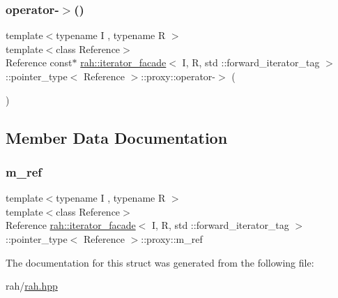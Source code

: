 \subsubsection{\texorpdfstring{operator-\/$>$()}{operator->()}}
{\footnotesize\ttfamily template$<$typename I , typename R $>$ \\
template$<$class Reference$>$ \\
Reference const$\ast$ \mbox{\hyperlink{structrah_1_1iterator__facade}{rah\+::iterator\+\_\+facade}}$<$ I, R, std \+::forward\+\_\+iterator\+\_\+tag $>$\+::pointer\+\_\+type$<$ Reference $>$\+::proxy\+::operator-\/$>$ (\begin{DoxyParamCaption}{ }\end{DoxyParamCaption})\hspace{0.3cm}{\ttfamily [inline]}}



\subsection{Member Data Documentation}
\mbox{\label{structrah_1_1iterator__facade_3_01_i_00_01_r_00_01std_01_1_1forward__iterator__tag_01_4_1_1pointer__type_1_1proxy_a43f4d891456f1f4c0bb1c05ca56c74c9}} 
\subsubsection{\texorpdfstring{m\_ref}{m\_ref}}
{\footnotesize\ttfamily template$<$typename I , typename R $>$ \\
template$<$class Reference$>$ \\
Reference \mbox{\hyperlink{structrah_1_1iterator__facade}{rah\+::iterator\+\_\+facade}}$<$ I, R, std \+::forward\+\_\+iterator\+\_\+tag $>$\+::pointer\+\_\+type$<$ Reference $>$\+::proxy\+::m\+\_\+ref}



The documentation for this struct was generated from the following file\+:\begin{DoxyCompactItemize}
\item 
rah/\mbox{\hyperlink{rah_8hpp}{rah.\+hpp}}\end{DoxyCompactItemize}
